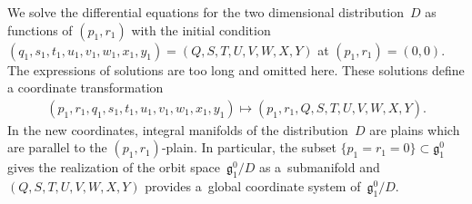 \documentclass[pdftex]{sigma}
\numberwithin{equation}{section}
\begin{document}
We solve the dif\/ferential equations for the two dimensional distribution~$D$ as functions of $(p_1, r_1)$ with the initial condition $(q_1, s_1, t_1, u_1, v_1, w_1, x_1, y_1) =(Q,S,T,U,V,W,X,Y)$ at $(p_1, r_1) = (0,0)$. The expressions of solutions are too long and omitted here. These solutions def\/ine a coordinate transformation
\begin{gather*}
(p_1, r_1, q_1, s_1, t_1, u_1, v_1, w_1, x_1, y_1) \mapsto (p_1, r_1, Q,S,T,U,V,W,X,Y).
\end{gather*}
In the new coordinates, integral manifolds of the distribution~$D$ are plains which are parallel to the $(p_1, r_1)$-plain. In particular, the subset $\{ p_1 = r_1 = 0\} \subset \mathfrak{g}^0_1$ gives the realization of the orbit space~$\mathfrak{g}^0_1/D$ as a~submanifold and $(Q,S,T,U,V,W,X,Y)$ provides a~global coordinate system of~$\mathfrak{g}^0_1/D$.
\end{document}
